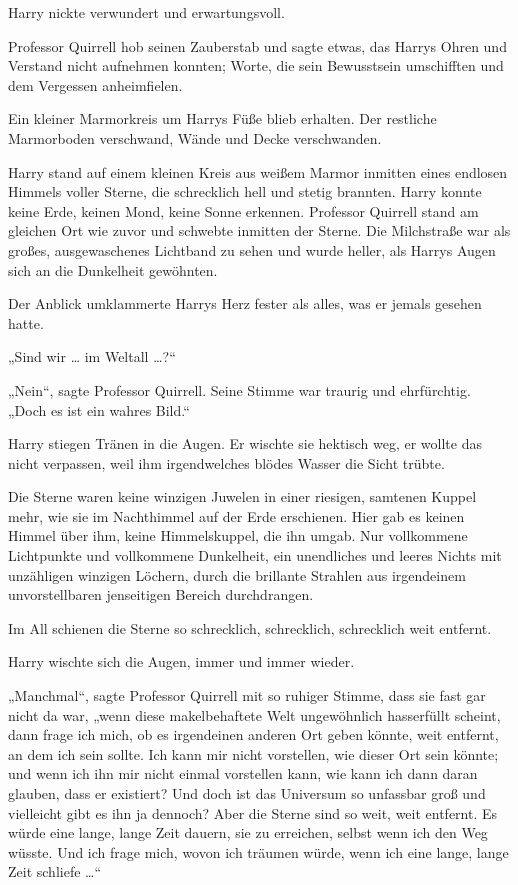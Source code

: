 {Harry nickte verwundert und erwartungsvoll.

Professor Quirrell hob seinen Zauberstab und sagte etwas, das Harrys Ohren und Verstand nicht aufnehmen konnten; Worte, die sein Bewusstsein umschifften und dem Vergessen anheimfielen.

Ein kleiner Marmorkreis um Harrys Füße blieb erhalten. Der restliche Marmorboden verschwand, Wände und Decke verschwanden.

Harry stand auf einem kleinen Kreis aus weißem Marmor inmitten eines endlosen Himmels voller Sterne, die schrecklich hell und stetig brannten. Harry konnte keine Erde, keinen Mond, keine Sonne erkennen. Professor Quirrell stand am gleichen Ort wie zuvor und schwebte inmitten der Sterne. Die Milchstraße war als großes, ausgewaschenes Lichtband zu sehen und wurde heller, als Harrys Augen sich an die Dunkelheit gewöhnten.

Der Anblick umklammerte Harrys Herz fester als alles, was er jemals gesehen hatte.

„Sind wir … im Weltall …?“

„Nein“, sagte Professor Quirrell. Seine Stimme war traurig und ehrfürchtig. „Doch es ist ein wahres Bild.“

Harry stiegen Tränen in die Augen. Er wischte sie hektisch weg, er wollte das nicht verpassen, weil ihm irgendwelches blödes Wasser die Sicht trübte.

Die Sterne waren keine winzigen Juwelen in einer riesigen, samtenen Kuppel mehr, wie sie im Nachthimmel auf der Erde erschienen. Hier gab es keinen Himmel über ihm, keine Himmelskuppel, die ihn umgab. Nur vollkommene Lichtpunkte und vollkommene Dunkelheit, ein unendliches und leeres Nichts mit unzähligen winzigen Löchern, durch die brillante Strahlen aus irgendeinem unvorstellbaren jenseitigen Bereich durchdrangen.

Im All schienen die Sterne so schrecklich, schrecklich, schrecklich weit entfernt.

Harry wischte sich die Augen, immer und immer wieder.

„Manchmal“, sagte Professor Quirrell mit so ruhiger Stimme, dass sie fast gar nicht da war, „wenn diese makelbehaftete Welt ungewöhnlich hasserfüllt scheint, dann frage ich mich, ob es irgendeinen anderen Ort geben könnte, weit entfernt, an dem ich sein sollte. Ich kann mir nicht vorstellen, wie dieser Ort sein könnte; und wenn ich ihn mir nicht einmal vorstellen kann, wie kann ich dann daran glauben, dass er existiert? Und doch ist das Universum so unfassbar groß und vielleicht gibt es ihn ja dennoch? Aber die Sterne sind so weit, weit entfernt. Es würde eine lange, lange Zeit dauern, sie zu erreichen, selbst wenn ich den Weg wüsste. Und ich frage mich, wovon ich träumen würde, wenn ich eine lange, lange Zeit schliefe …“

}

